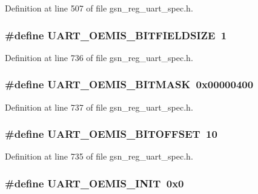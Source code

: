 Definition at line 507 of file gsn\_\-reg\_\-uart\_\-spec.h.

\hypertarget{a00575_a2fb4eea13b23d656e1e64aedc6049573}{
\subsubsection[{UART\_\-OEMIS\_\-BITFIELDSIZE}]{\setlength{\rightskip}{0pt plus 5cm}\#define UART\_\-OEMIS\_\-BITFIELDSIZE~1}}
\label{a00575_a2fb4eea13b23d656e1e64aedc6049573}


Definition at line 736 of file gsn\_\-reg\_\-uart\_\-spec.h.

\hypertarget{a00575_a47929196fa1c1746a06811b8783c818a}{
\subsubsection[{UART\_\-OEMIS\_\-BITMASK}]{\setlength{\rightskip}{0pt plus 5cm}\#define UART\_\-OEMIS\_\-BITMASK~0x00000400}}
\label{a00575_a47929196fa1c1746a06811b8783c818a}


Definition at line 737 of file gsn\_\-reg\_\-uart\_\-spec.h.

\hypertarget{a00575_a868743cc2520e2ce9df53c3071cf894a}{
\subsubsection[{UART\_\-OEMIS\_\-BITOFFSET}]{\setlength{\rightskip}{0pt plus 5cm}\#define UART\_\-OEMIS\_\-BITOFFSET~10}}
\label{a00575_a868743cc2520e2ce9df53c3071cf894a}


Definition at line 735 of file gsn\_\-reg\_\-uart\_\-spec.h.

\hypertarget{a00575_a782c74d367c6c4e69a5c211297d2ea21}{
\subsubsection[{UART\_\-OEMIS\_\-INIT}]{\setlength{\rightskip}{0pt plus 5cm}\#define UART\_\-OEMIS\_\-INIT~0x0}}
\label{a00575_a782c74d367c6c4e69a5c211297d2ea21}


